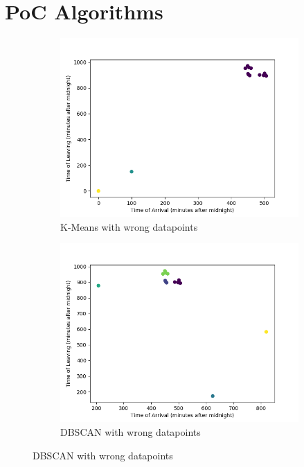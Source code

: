 \documentclass[paper=a4, fontsize=11pt]{article}
\begin{document}
\section{PoC Algorithms}
\begin{figure}[H]
  \centering
  \begin{subfigure}[b]{0.2\linewidth}
    \includegraphics[width=\linewidth]{POC_simple_data_labels_two_wrong_point.png}
     \caption{K-Means with wrong datapoints}
	\label{fig:kmean1}
  \end{subfigure}
  \begin{subfigure}[b]{0.2\linewidth}
    \includegraphics[width=\linewidth]{POC_simple_data_labels_two_wrong_point_dbscan.png}
    \caption{DBSCAN with wrong datapoints}

\end{subfigure}
\end{figure}
\end{document}
